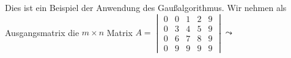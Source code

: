 Dies ist ein Beispiel der Anwendung des Gaußalgorithmus.
Wir nehmen als  Ausgangsmatrix die $m\times n$ Matrix 
$A=\begin{vmatrix}
0 & 0 & 1 & 2 & 9 \\ 
0 & 3 & 4 & 5 & 9 \\ 
0 & 6 & 7 & 8 & 9 \\ 
0 & 9 & 9 & 9 & 9
\end{vmatrix} 
\leadsto
$